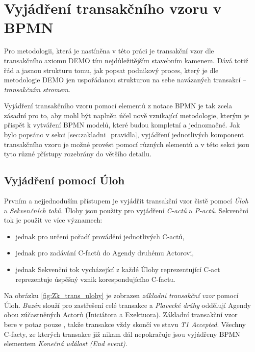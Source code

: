 \documentclass[]{article}
\begin{document}
\section{Vyjádření transakčního vzoru v BPMN} \label{sec:vyjadreni_trans_vzor}
Pro metodologii, která je nastíněna v této práci je transakční vzor dle transakčního axiomu DEMO tím nejdůležitějším stavebním kamenem. Dává totiž řád a jasnou strukturu tomu, jak popsat podnikový proces, který je dle metodologie DEMO jen uspořádanou strukturou na sebe navázaných transakcí – \textit{transakčním stromem}.

Vyjádření transakčního vzoru pomocí elementů z notace BPMN je tak zcela zásadní pro to, aby mohl být naplněn účel nově vznikající metodologie, kterým je přispět k vytváření BPMN modelů, které budou kompletní a jednoznačné. Jak bylo popsáno v sekci \ref{sec:zakladni_pravidla}, vyjádření jednotlivých komponent transakčního vzoru je možné provést pomocí různých elementů a v této sekci jsou tyto různé přístupy rozebrány do většího detailu. 

\subsection{Vyjádření pomocí Úloh} \label{sec:vyjadreni_ulohy}
Prvním a nejjednoduším přístupem je vyjádřit transakční vzor čistě pomocí \textit{Úloh} a \textit{Sekvenčních toků}. Úlohy jsou použity pro vyjádření \textit{C-actů} a \textit{P-actů}. Sekvenční tok je použit ve více významech:

\begin{itemize}
\item jednak pro určení pořadí provádění jednotlivých C-actů,
\item jednak pro zadávání C-factů do Agendy druhému Actorovi,
\item jednak Sekvenční tok vycházející z každé Úlohy reprezentující C-act reprezentuje úspěšný vznik korespondujícího C-factu.
\end{itemize}

Na obrázku \ref{fig:Zk_trans_ulohy} je zobrazen \textit{základní transakční vzor} pomocí Úloh. \textit{Bazén} slouží pro zastřešení celé transakce a \textit{Plavecké dráhy} oddělují Agendy obou zúčastněných Actorů (Iniciátora a Exektuora). Základní transakční vzor bere v potaz pouze , takže transakce vždy skončí ve stavu \textit{T1 Accepted}. Všechny C-facty, ze kterých transakce již nikam dál nepokračuje jsou vyjádřeny BPMN elementem \textit{Konečná událost (End event)}.
\end{document}
